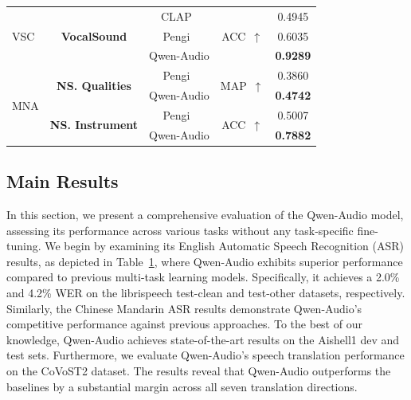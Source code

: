 \documentclass{article}
\begin{document}
\begin{table}[t!]
{\begin{tabular}{lcccc}
\multirow{3}{*}{VSC}       & \multirow{3}{*}{\textbf{VocalSound}}     & CLAP~\citep{CLAP}                   & \multirow{3}{*}{ACC~$\uparrow$}                    & 0.4945                \\
                                                  &                                 & Pengi~\citep{Pengi}                  &                                         & 0.6035                \\
                                                  &                                 & Qwen-Audio                    &                                         & \textbf{0.9289}                \\ \midrule
\multirow{4}{*}{MNA}             
                                                  & \multirow{2}{*}{\textbf{NS. Qualities}}  & Pengi~\citep{Pengi}                  & \multirow{2}{*}{MAP~$\uparrow$}                    & 0.3860                \\
                                                  &                                 & Qwen-Audio                    &                                         & \textbf{0.4742}                \\ \cmidrule(l){2-5} 
                                                  & \multirow{2}{*}{\textbf{NS. Instrument}} & Pengi~\citep{Pengi}                  & \multirow{2}{*}{ACC~$\uparrow$}                    & 0.5007                \\
                                                  &                                 & Qwen-Audio                   &                                         & \textbf{0.7882}                \\ \bottomrule
\end{tabular}%
}
\label{tab:audio_analysis_table}
\end{table}

\subsection{Main Results}
In this section, we present a comprehensive evaluation of the Qwen-Audio model, assessing its performance across various tasks without any task-specific fine-tuning. We begin by examining its English Automatic Speech Recognition (ASR) results, as depicted in Table~\ref{tab:audio_analysis_table}, where Qwen-Audio exhibits superior performance compared to previous multi-task learning models. Specifically, it achieves a 2.0\% and 4.2\% WER on the librispeech test-clean and test-other datasets, respectively. Similarly, the Chinese Mandarin ASR results demonstrate Qwen-Audio's competitive performance against previous approaches. To the best of our knowledge, Qwen-Audio achieves state-of-the-art results on the Aishell1 dev and test sets. Furthermore, we evaluate Qwen-Audio's speech translation performance on the CoVoST2 dataset. The results reveal that Qwen-Audio outperforms the baselines by a substantial margin across all seven translation directions.
\end{document}
